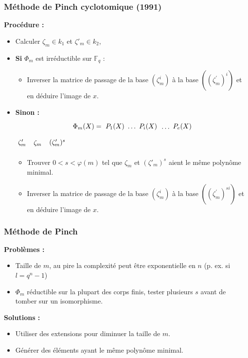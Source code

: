 \documentclass{beamer} %
\numberwithin{equation}{section}
\newcommand\GF[1]{\mathbb{F}_{#1}}
\begin{document}
\begin{frame}
\frametitle{Méthode de Pinch cyclotomique (1991)}
\textbf{Procédure :}
\begin{itemize}
	\item Calculer $\zeta_m\in k_1$ et $\zeta'_m\in k_2$,
\item \textbf{Si} $\Phi_m$ est irréductible sur $\GF{q}$ :
\begin{itemize}
	\item Inverser la matrice de passage de la base $(\zeta_m^i)$ à la base
$((\zeta_m^{\prime})^i)$ et en déduire l'image de $x$.
\end{itemize}
\vspace{0.3cm}
\item \textbf{Sinon :}\\
\begin{equation*}
\Phi_m(X) = \tikz[baseline]{\node[anchor=base] (t1) {$P_1(X)$};} \dots 
\tikz[baseline]{\node[anchor=base] (t2) {$P_i(X)$};}  
\tikz[baseline]{\node[] (t3) {$\dots$};} P_e(X)
\end{equation*}
\hspace{3.5cm}
$\tikz\node [] (n1) {$\zeta'_m$};$
\hspace{0.8cm}
$\tikz\node [] (n2) {$\zeta_m$};$
\hspace{0.3cm}
$\tikz\node [] (n3) {$(\zeta'_m)^{s}$};$
	\begin{itemize}
	\item Trouver $0 < s < \varphi(m)$ tel que $\zeta_m$ et $(\zeta'_m)^s$ aient
le même polynôme minimal.
	\item Inverser la matrice de passage de la base $(\zeta_m^i)$ à la base
$((\zeta_m^{\prime})^{si})$ et en déduire l'image de $x$.
	\end{itemize}
\end{itemize}


\end{frame}
\begin{frame}
\frametitle{Méthode de Pinch}
\textbf{Problèmes :}
\begin{itemize}
	\item Taille de $m$, au pire la complexité peut être exponentielle en $n$
(p. ex. si $l = q^n - 1$)
	\item $\Phi_m$ réductible sur la plupart des corps finis, tester plusieurs
$s$ avant de tomber sur un isomorphisme.
\end{itemize}
\textbf{Solutions :}
\begin{itemize}
	\item Utiliser des extensions pour diminuer la taille de $m$.
	\item Générer des éléments ayant le même polynôme minimal.
\end{itemize}
\end{frame}
\end{document}
